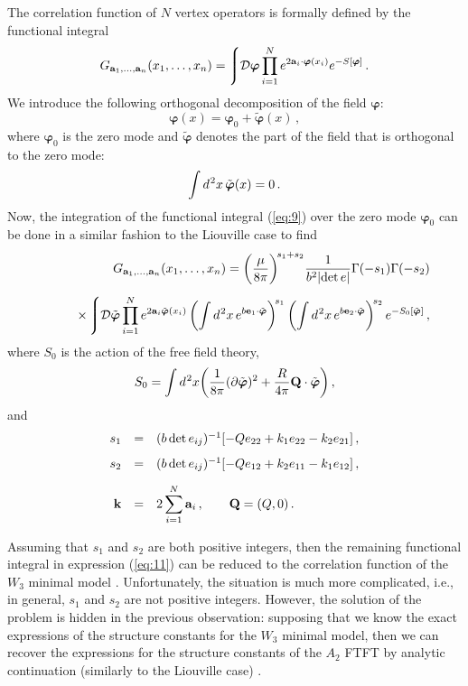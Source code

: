 \documentclass[a4paper,12pt]{article}
\newcommand{\bm}{\boldsymbol}
\begin{document}
The  correlation function of $N$ vertex operators is
formally defined by the functional integral
\begin{equation}
G_{{\bf a}_1,\ldots,{\bf a}_n}(x_1,\ldots,x_n)
=\Bigg\lmoustache \mathcal{D}{\bm\varphi}
\prod^N_{i=1} e^{2{\bf a}_i\cdot{\bm\varphi}(x_i)}
e^{-S[{\bm\varphi}]}\,.
\label{eq:9}
\end{equation}
We introduce the following orthogonal decomposition of the field
$\boldsymbol{\varphi}$:
$$
{\bm\varphi}(x)={\bm\varphi}_0+\tilde{\bm\varphi}(x)\,,
$$
where ${\bm\varphi}_0$ is the zero mode and $\tilde{\bm\varphi}$ 
denotes the part of the field that is orthogonal to the zero mode:
$$
\int d^{\kern0.6pt2}x\,\tilde{\bm\varphi}(x)=0\, .
$$
Now, the integration of the functional integral (\ref{eq:9}) over the zero mode
${\bm\varphi}_0$ can be done in a similar fashion to the Liouville
case \cite{GLi} to find 
\begin{eqnarray}	
&&G_{{\bf a}_1,\ldots,{\bf a}_n}(x_1,\ldots,x_n)
=\bigg(\frac{\mu}{8\pi}\bigg)^{\!s_1+s_2}
\frac{1}{b^2|{\rm det}\,e|}
\Gamma(-s_1)\Gamma(-s_2)\nonumber\\[5pt]
&&\hskip20pt\times\,\displaystyle
\Bigg\lmoustache \mathcal{D}\tilde{\bm\varphi}
\displaystyle\prod^N_{i=1}
e^{2{\bf a}_i\tilde{\bm\varphi}(x_i)}
\left(\displaystyle\int d^{\kern0.6pt2}x\, 
e^{b{\bf e}_1\cdot\tilde{\bm\varphi}}\right)^{\!s_1}
\left(\displaystyle\int d^{\kern0.6pt2}x\,
e^{b{\bf e}_2\cdot\tilde{\bm\varphi}}\right)^{\!s_2}
e^{-S_0[\tilde{\bm\varphi}]}\, ,
\label{eq:11}
\end{eqnarray}
where $S_0$ is the action of the free field theory, 
$$
S_0=\int d^{\kern0.6pt2}x
\bigg(\frac{1}{8\pi}(\partial\tilde{\bm\varphi})^2
+\frac{R}{4\pi}{\bf Q}\cdot\tilde{\bm\varphi}\bigg)\, ,
$$
and
\begin{eqnarray*}	
\begin{array}{rcl}
s_1 &=&(b\,{\rm det}\,e_{ij})^{-1}
[-Qe_{22}+k_1e_{22}-k_2e_{21}]\,,\\[8pt]
s_2 &=&(b\,{\rm det}\,e_{ij})^{-1}
[-Qe_{12}+k_2e_{11}-k_1e_{12}]\,,\\[10pt]
{\bf k} &=&2\displaystyle\sum^N_{i=1} {\bf a}_i\,,\qquad
{\bf Q}=(Q,0)\,.
\end{array}
\end{eqnarray*}

Assuming that  $s_1$ and $s_2$ are both  positive integers,
then the remaining functional integral in
expression (\ref{eq:11}) can be reduced to the correlation function of the
$W_3$ minimal model \cite{FZ,LF}.
Unfortunately, the situation is much more complicated, i.e., in general,
 $s_1$ and $s_2$ are not
positive integers. However,  the solution of the problem is hidden in
the previous observation: supposing that we know the exact
expressions of the structure constants for the  $W_3$ minimal
model, then we can recover the
expressions for the structure constants of the $A_2$ FTFT by analytic
continuation (similarly to the Liouville case) \cite{DO,ZZ}.
\end{document}
